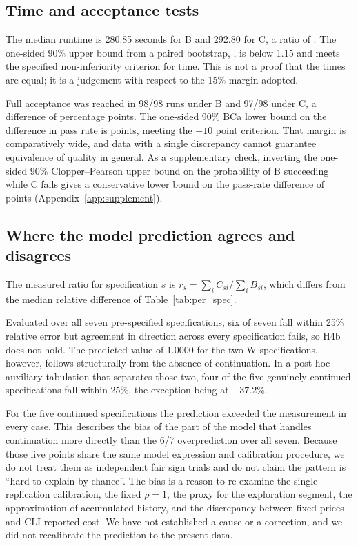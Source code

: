 \documentclass[a4paper,11pt]{article}
\newcommand{\spec}[1]{\texttt{\detokenize{#1}}}
\begin{document}
\subsection{Time and acceptance tests}\label{sec:time_quality}
The median runtime is 280.85 seconds for B and 292.80 for C, a ratio of \TimeRatio{}. The one-sided 90\% upper bound from a paired bootstrap, \TimeUpper{}, is below 1.15 and meets the specified non-inferiority criterion for time. This is not a proof that the times are equal; it is a judgement with respect to the 15\% margin adopted.

Full acceptance was reached in 98/98 runs under B and 97/98 under C, a difference of \QualityDiff{} percentage points. The one-sided 90\% BCa lower bound on the difference in pass rate is \QualityLower{} points, meeting the $-10$ point criterion. That margin is comparatively wide, and data with a single discrepancy cannot guarantee equivalence of quality in general. As a supplementary check, inverting the one-sided 90\% Clopper--Pearson upper bound on the probability of B succeeding while C fails gives a conservative lower bound on the pass-rate difference of \QualityExact{} points (Appendix~\ref{app:supplement}).

\subsection{Where the model prediction agrees and disagrees}\label{sec:model_fit}
The measured ratio for specification $s$ is $r_s=\sum_i C_{si}/\sum_i B_{si}$, which differs from the median relative difference of Table~\ref{tab:per_spec}.
\begin{table}[!htbp]
\centering\small

\caption{Comparison against the frozen prediction. Relative error is $(r_s-\widehat r_s)/\widehat r_s$. A prediction of exactly 1.0000 is not a prediction of an increase.}
\label{tab:model}
\end{table}
Evaluated over all seven pre-specified specifications, six of seven fall within 25\% relative error but agreement in direction across every specification fails, so H4b does not hold. The predicted value of 1.0000 for the two W specifications, however, follows structurally from the absence of continuation. In a post-hoc auxiliary tabulation that separates those two, four of the five genuinely continued specifications fall within 25\%, the exception being \spec{n_db_chain} at $-37.2$\%.

For the five continued specifications the prediction exceeded the measurement in every case. This describes the bias of the part of the model that handles continuation more directly than the 6/7 overprediction over all seven. Because those five points share the same model expression and calibration procedure, we do not treat them as independent fair sign trials and do not claim the pattern is ``hard to explain by chance''. The bias is a reason to re-examine the single-replication calibration, the fixed $\rho=1$, the proxy for the exploration segment, the approximation of accumulated history, and the discrepancy between fixed prices and CLI-reported cost. We have not established a cause or a correction, and we did not recalibrate the prediction to the present data.
\end{document}
